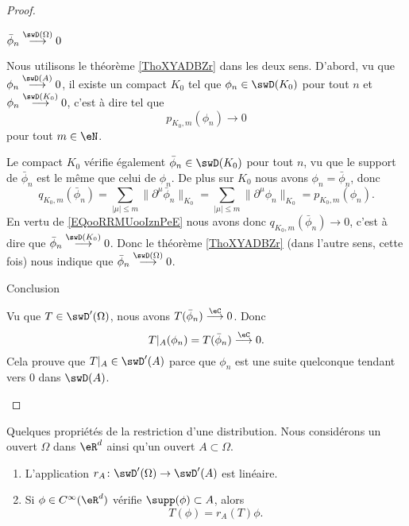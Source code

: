 \begin{proof}
\begin{subproof}
\item[$ \bar\phi_n\stackrel{\swD(\Omega)}{\longrightarrow}0$ ]

    Nous utilisons le théorème \ref{ThoXYADBZr} dans les deux sens. D'abord, vu que \( \phi_n\stackrel{\swD(A)}{\longrightarrow}0\), il existe un compact \( K_0\) tel que \( \phi_n\in\swD(K_0)\) pour tout \( n\) et \( \phi_n\stackrel{\swD(K_0)}{\longrightarrow}0\), c'est à dire tel que
    \begin{equation}        \label{EQooRRMUooIznPeE}
        p_{K_0,m}(\phi_n)\to 0
    \end{equation}
    pour tout \( m\in \eN\).

    Le compact \( K_0\) vérifie également \( \bar\phi_n\in \swD(K_0)\) pour tout \( n\), vu que le support de \( \bar\phi_n\) est le même que celui de \( \phi_n\). De plus sur \( K_0\) nous avons \( \phi_n=\bar\phi_n\), donc
    \begin{equation}
        q_{K_0,m}(\bar\phi_n)=\sum_{| \mu |\leq m}\| \partial^{\mu}\bar\phi_n \|_{K_0}=\sum_{| \mu |\leq m}\| \partial^{\mu}\phi_n \|_{K_0}=p_{K_0,m}(\phi_n).
    \end{equation}
    En vertu de \eqref{EQooRRMUooIznPeE} nous avons donc \( q_{K_0,m}(\bar\phi_n)\to 0\), c'est à dire que \( \bar\phi_n\stackrel{\swD(K_0)}{\longrightarrow}0\). Donc le théorème \ref{ThoXYADBZr} (dans l'autre sens, cette fois) nous indique que \( \bar\phi_n\stackrel{\swD(\Omega)}{\longrightarrow}0\).


\item[Conclusion]

    Vu que \( T\in \swD'(\Omega)\), nous avons \( T(\bar\phi_n)\stackrel{\eC}{\longrightarrow}0\). Donc
    \begin{equation}
        T|_A(\phi_n)=T(\bar\phi_n)\stackrel{\eC}{\longrightarrow}0.
    \end{equation}
    Cela prouve que \( T|_A\in \swD'(A)\) parce que \( \phi_n\) est une suite quelconque tendant vers \( 0\) dans \( \swD(A)\).
    \end{subproof}
\end{proof}


\begin{lemma}       \label{LEMooCXIZooAbeMpF}
    Quelques propriétés de la restriction d'une distribution. Nous considérons un ouvert \( \Omega\) dans \( \eR^d\) ainsi qu'un ouvert \( A\subset \Omega\).
    \begin{enumerate}
        \item
        L'application \( r_A\colon \swD'(\Omega)\to \swD'(A)\) est linéaire.
    \item       \label{ITEMooGXSKooYomqpg}
        Si \( \phi\in  C^{\infty}(\eR^d)\) vérifie \( \supp(\phi)\subset A\), alors
        \begin{equation}
            T(\phi)=r_A(T)\phi.
        \end{equation}
    \end{enumerate}
\end{lemma}



